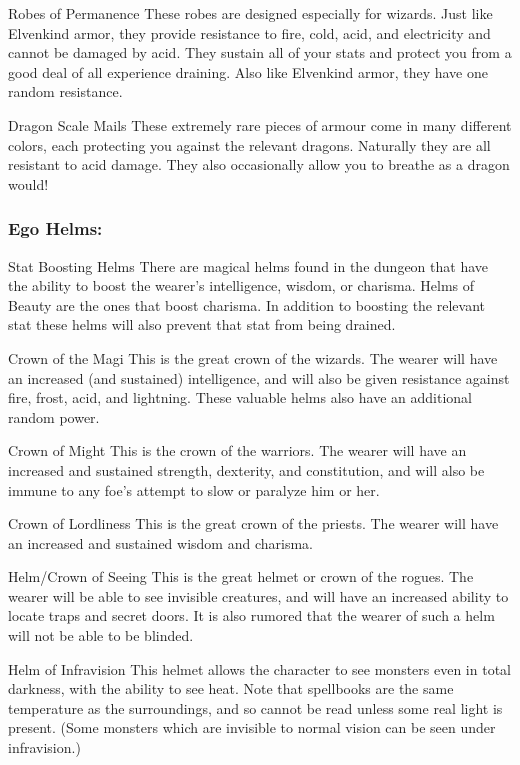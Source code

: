 Robes of Permanence
     These robes are designed especially for wizards. Just like Elvenkind
     armor, they provide resistance to fire, cold, acid, and electricity and
     cannot be damaged by acid. They sustain all of your stats and protect
     you from a good deal of all experience draining. Also like Elvenkind
     armor, they have one random resistance.

Dragon Scale Mails
     These extremely rare pieces of armour come in many different colors,
     each protecting you against the relevant dragons. Naturally they are
     all resistant to acid damage. They also occasionally allow you to
     breathe as a dragon would!

\subsubsection{Ego Helms:}
Stat Boosting Helms
     There are magical helms found in the dungeon that have the ability
     to boost the wearer's intelligence, wisdom, or charisma. Helms of
     Beauty are the ones that boost charisma. In addition to boosting
     the relevant stat these helms will also prevent that stat from being
     drained.

Crown of the Magi
     This is the great crown of the wizards. The wearer will have an
     increased (and sustained) intelligence, and will also be given
     resistance against fire, frost, acid, and lightning. These valuable
     helms also have an additional random power.

Crown of Might
     This is the crown of the warriors. The wearer will have an
     increased and sustained strength, dexterity, and constitution,
     and will also be immune to any foe's attempt to slow or paralyze
     him or her.

Crown of Lordliness
     This is the great crown of the priests. The wearer will have an
     increased and sustained wisdom and charisma.

Helm/Crown of Seeing
     This is the great helmet or crown of the rogues. The wearer will be
     able to see invisible creatures, and will have an increased ability to
     locate traps and secret doors. It is also rumored that the wearer of
     such a helm will not be able to be blinded.

Helm of Infravision
     This helmet allows the character to see monsters even in total
     darkness, with the ability to see heat. Note that spellbooks are the
     same temperature as the surroundings, and so cannot be read unless
     some real light is present. (Some monsters which are invisible to
     normal vision can be seen under infravision.)

